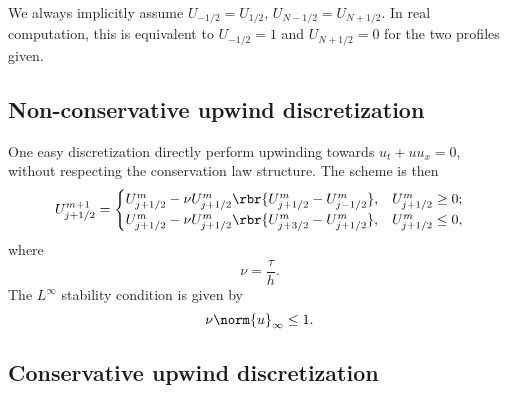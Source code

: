 \documentclass[english, nochinese]{pnote}
\begin{document}
We always implicitly assume $ U_{ -1 / 2 } = U_{ 1 / 2 } $, $ U_{ N - 1 / 2 } = U_{ N + 1 / 2 } $. In real computation, this is equivalent to $ U_{ -1 / 2 } = 1 $ and $ U_{ N + 1 / 2 } = 0 $ for the two profiles given.

\subsection{Non-conservative upwind discretization}

One easy discretization directly perform upwinding towards $ u_t + u u_x = 0 $, without respecting the conservation law structure. The scheme is then
\begin{equation}
U_{ j + 1 / 2 }^{ m + 1 } =
\begin{cases}
U_{ j + 1 / 2 }^m - \nu U_{ j + 1 / 2 }^m \rbr{ U_{ j + 1 / 2 }^m - U_{ j - 1 / 2 }^m }, & U_{ j + 1 / 2 }^m \ge 0; \\
U_{ j + 1 / 2 }^m - \nu U_{ j + 1 / 2 }^m \rbr{ U_{ j + 3 / 2 }^m - U_{ j + 1 / 2 }^m }, & U_{ j + 1 / 2 }^m \le 0,
\end{cases}
\end{equation}
where
\begin{equation}
\nu = \frac{\tau}{h}.
\end{equation}
The $L^{\infty}$ stability condition is given by
\begin{equation}
\nu \norm{u}_{\infty} \le 1.
\end{equation}

\subsection{Conservative upwind discretization}
\end{document}
